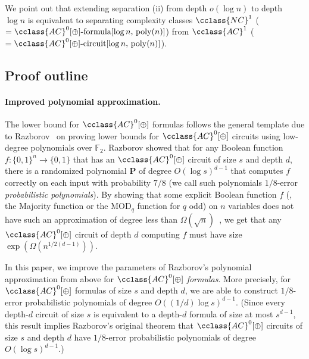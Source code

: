 \documentclass{toc}
\newcommand{\mb}{\mathbf}
\newcommand{\F}{\mathbb{F}}
\newcommand{\AC}{\cclass{AC}}
\newcommand{\NC}{\cclass{NC}}
\begin{document}
We point out that extending separation (ii) from depth $o(\log n)$ to depth $\log n$ is equivalent to separating complexity classes $\NC^1$ ($= \AC^0[\oplus]\textup{-formula}[\log n,\,\mathrm{poly}(n)]$) from $\AC^1$ ($= \AC^0[\oplus]\textup{-circuit}[\log n,\,\mathrm{poly}(n)]$). 


\subsection{Proof outline}

\paragraph{Improved polynomial approximation.} The lower bound for $\AC^0[\oplus]$ formulas follows the general template due to Razborov~\cite{Razborov} on proving lower bounds for $\AC^0[\oplus]$ circuits using low-degree polynomials over $\F_2$. Razborov showed that for any Boolean function $f:\{0,1\}^n\rightarrow \{0,1\}$ that has an $\AC^0[\oplus]$ circuit of size $s$ and depth $d$, there is a randomized polynomial $\mb P$ of degree $O(\log s)^{d-1}$ that computes $f$ correctly on each input with probability ${7}/{8}$ (we call such polynomials $1/8$-error \emph{probabilistic polynomials}). By showing that some explicit Boolean function $f$ (\eg, the Majority function or the $\mathrm{MOD}_q$ function for $q$ odd) on $n$ variables does not have such an approximation of degree less than $\Omega(\sqrt{n})$~\cite{Razborov,Smolensky87,Szegedy1989,  %
Smolensky93}, we get that any $\AC^0[\oplus]$ circuit of depth $d$ computing $f$ must have size $\exp(\Omega(n^{1/2(d-1)}))$.

In this paper, we improve the parameters of Razborov's polynomial approximation from above for $\AC^0[\oplus]$ \emph{formulas}. More precisely, for $\AC^0[\oplus]$ formulas of size $s$ and depth $d$, we are able to construct $1/8$-error probabilistic polynomials of degree $O(({1}/{d})\log s)^{d-1}$. (Since every depth-$d$ circuit of size $s$ is equivalent to a depth-$d$ formula of size at most $s^{d-1}$, this result implies Razborov's original theorem that $\AC^0[\oplus]$ circuits of size $s$ and depth $d$ have $1/8$-error probabilistic polynomials of degree $O(\log s)^{d-1}$.)
\end{document}

